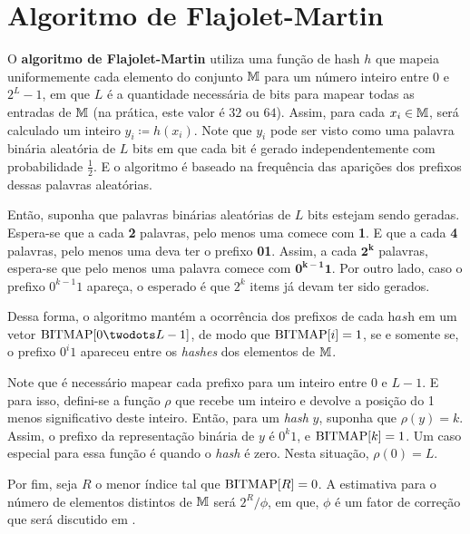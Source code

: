 \section{Algoritmo de Flajolet-Martin}
\label{sec:flajolet-martin:algorithm}

O \textbf{algoritmo de Flajolet-Martin} utiliza uma função de hash $h$ que mapeia uniformemente cada elemento do 
conjunto $\mathbb{M}$ para um número inteiro entre $0$ e $2^L-1$, em que $L$ é a quantidade necessária de bits para 
mapear todas as entradas de $\mathbb{M}$ (na prática, este valor é $32$ ou $64$). Assim, para cada $x_i \in \mathbb{M}$, 
será calculado um inteiro $y_i \coloneqq h(x_i)$. Note que $y_i$ pode ser visto como uma palavra binária aleatória de 
$L$ bits em que cada bit é gerado independentemente com probabilidade $\frac{1}{2}$. E o algoritmo é baseado na 
frequência das aparições dos prefixos dessas palavras aleatórias.

Então, suponha que palavras binárias aleatórias de $L$ bits estejam sendo geradas. Espera-se que a cada \textbf{2} 
palavras, pelo menos uma comece com \textbf{1}. E que a cada \textbf{4} palavras, pelo menos uma deva ter o prefixo 
\textbf{01}. Assim, a cada $\mathbf{2^k}$ palavras, espera-se que pelo menos uma palavra comece com $\mathbf{0^{k-1}1}$. 
Por outro lado, caso o prefixo $0^{k-1}1$ apareça, o esperado é que $2^{k}$ items já devam ter sido gerados. 

Dessa forma, o algoritmo mantém a ocorrência dos prefixos de cada $\textit{hash}$ em um vetor $\bitmap[0 \twodots L-1]$, 
de modo que $\text{BITMAP}[i] = 1$, se e somente se, o prefixo $0^i1$ apareceu entre os \textit{hashes} dos elementos de 
$\mathbb{M}$. 

Note que é necessário mapear cada prefixo para um inteiro entre $0$ e $L - 1$. E para isso, defini-se a função $\rho$ 
que recebe um inteiro e devolve a posição do 1 menos significativo deste inteiro. Então, para um \textit{hash} $y$, 
suponha que $\rho(y) = k$. Assim, o prefixo da representação binária de $y$ é $0^k1$, e $\text{BITMAP}[k] = 1$. Um caso 
especial para essa função é quando o \textit{hash} é zero. Nesta situação, $\rho(0) = L$.

Por fim, seja $R$ o menor índice tal que $\text{BITMAP}[R] = 0$. A estimativa para o número de elementos distintos de 
$\mathbb{M}$ será $2^R/\phi$, em que, $\phi$ é um fator de correção que será discutido em 
.

